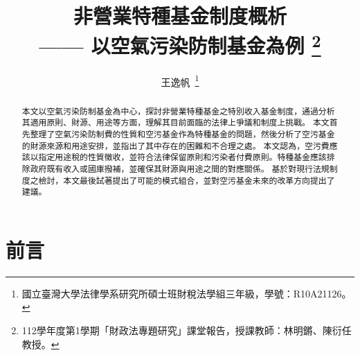 \documentclass[12pt,a4paper]{article}
\author{王逸帆\,
\thanks{國立臺灣大學法律學系研究所碩士班財稅法學組三年級，學號：R10A21126。}
\vspace{-60em}
}
\date{}
\title{非營業特種基金制度概析
\\  \large —— 以空氣污染防制基金為例
\thanks{
  112學年度第1學期「財政法專題研究」課堂報告，授課教師：林明鏘、陳衍任教授。}}
\begin{document}
\maketitle
\makeatother

\vspace{1pt}

\begin{abstract}
\setlength{\parindent}{2em}
\noindent
\hspace*{0.9\parindent}


本文以空氣污染防制基金為中心，探討非營業特種基金之特別收入基金制度，通過分析其適用原則、財源、用途等方面，理解其目前面臨的法律上爭議和制度上挑戰。
本文首先整理了空氣污染防制費的性質和空污基金作為特種基金的問題，然後分析了空污基金的財源來源和用途安排，並指出了其中存在的困難和不合理之處。 本文認為，空污費應該以指定用途稅的性質徵收，並符合法律保留原則和污染者付費原則。特種基金應該排除政府既有收入或國庫撥補，並確保其財源與用途之間的對應關係。 基於對現行法規制度之檢討，本文最後試著提出了可能的模式組合，並對空污基金未來的改革方向提出了建議。

   \end{abstract}



\thispagestyle{empty} %
\clearpage
    

\tableofcontents 

\listoftables


\thispagestyle{empty} %
\clearpage
\setcounter{page}{1} %

\section{前言}
\end{document}
